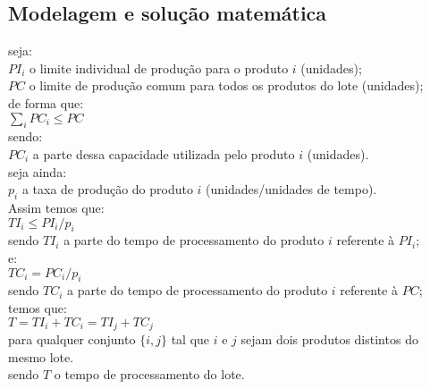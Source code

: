 \documentclass{book}
\begin{document}
\subsection{Modelagem e solução matemática}

seja: \\

$PI_i$ o limite individual de produção para o produto $i$ (unidades); \\

$PC$ o limite de produção comum para todos os produtos do lote (unidades); \\

de forma que: \\

$\sum_i{PC_i} \leq PC$ \\

sendo: \\

$PC_i$ a parte dessa capacidade utilizada pelo produto $i$ (unidades). \\

seja ainda: \\

$p_i$ a taxa de produção do produto $i$ (unidades/unidades de tempo). \\

Assim temos que: \\

$TI_i \leq PI_i/p_i$ \\

sendo $TI_i$ a parte do tempo de processamento do produto $i$ referente à $PI_i$; \\

e: \\

$TC_i = PC_i/p_i$ \\

sendo $TC_i$ a parte do tempo de processamento do produto $i$ referente à $PC$; \\

temos que: \\

$T = TI_{i} + TC_{i} = TI_{j} + TC_{j}$ \\

para qualquer conjunto $\{i,j\}$ tal que $i$ e $j$ sejam dois produtos distintos do mesmo lote. \\

sendo $T$ o tempo de processamento do lote. \\
\end{document}
